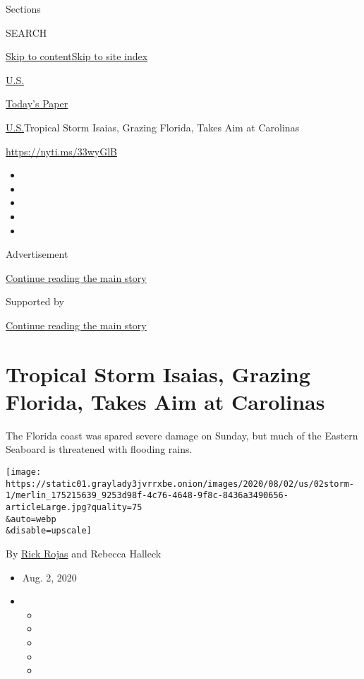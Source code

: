 Sections

SEARCH

\protect\hyperlink{site-content}{Skip to
content}\protect\hyperlink{site-index}{Skip to site index}

\href{https://www.nytimes3xbfgragh.onion/section/us}{U.S.}

\href{https://myaccount.nytimes3xbfgragh.onion/auth/login?response_type=cookie\&client_id=vi}{}

\href{https://www.nytimes3xbfgragh.onion/section/todayspaper}{Today's
Paper}

\href{/section/us}{U.S.}\textbar{}Tropical Storm Isaias, Grazing
Florida, Takes Aim at Carolinas

\url{https://nyti.ms/33wyGlB}

\begin{itemize}
\item
\item
\item
\item
\item
\end{itemize}

Advertisement

\protect\hyperlink{after-top}{Continue reading the main story}

Supported by

\protect\hyperlink{after-sponsor}{Continue reading the main story}

\hypertarget{tropical-storm-isaias-grazing-florida-takes-aim-at-carolinas}{%
\section{Tropical Storm Isaias, Grazing Florida, Takes Aim at
Carolinas}\label{tropical-storm-isaias-grazing-florida-takes-aim-at-carolinas}}

The Florida coast was spared severe damage on Sunday, but much of the
Eastern Seaboard is threatened with flooding rains.

\texttt{[image: https://static01.graylady3jvrrxbe.onion/images/2020/08/02/us/02storm-1/merlin\_175215639\_9253d98f-4c76-4648-9f8c-8436a3490656-articleLarge.jpg?quality=75\\\&auto=webp\\\&disable=upscale]}

By \href{https://www.nytimes3xbfgragh.onion/by/rick-rojas}{Rick Rojas}
and Rebecca Halleck

\begin{itemize}
\item
  Aug. 2, 2020
\item
  \begin{itemize}
  \item
  \item
  \item
  \item
  \item
  \end{itemize}
\end{itemize}

